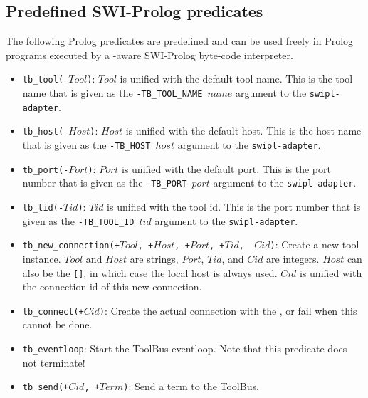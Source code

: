 \subsection{\label{Prolog-predicates}Predefined SWI-Prolog predicates}
The following Prolog predicates are predefined and can be used freely in
Prolog programs executed by a \TB -aware SWI-Prolog byte-code interpreter.

\begin{itemize}

\item {\tt tb\_tool(-$Tool$)}: $Tool$ is unified with the default tool name.
      This is the tool name that is given as the {\tt -TB\_TOOL\_NAME $name$}
      argument to the {\tt swipl-adapter}.

\item {\tt tb\_host(-$Host$)}: $Host$ is unified with the default host.
      This is the host name that is given as the {\tt -TB\_HOST $host$}
      argument to the {\tt swipl-adapter}.

\item {\tt tb\_port(-$Port$)}: $Port$ is unified with the default port.
      This is the port number that is given as the {\tt -TB\_PORT $port$}
      argument to the {\tt swipl-adapter}.

\item {\tt tb\_tid(-$Tid$)}: $Tid$ is unified with the tool id.
      This is the port number that is given as the {\tt -TB\_TOOL\_ID $tid$}
      argument to the {\tt swipl-adapter}.

\item {\tt tb\_new\_connection(+$Tool$, +$Host$, +$Port$, +$Tid$, -$Cid$)}: 
      Create a new tool instance. $Tool$ and $Host$ are
      strings, $Port$, $Tid$, and $Cid$ are integers. 
      $Host$ can also be the {\tt []}, in which
      case the local host is always used. $Cid$ is unified with the 
      connection id of this new connection.

\item {\tt tb\_connect(+$Cid$)}: Create the actual connection with the \TB,
      or fail when this cannot be done.

\item {\tt tb\_eventloop}: Start the ToolBus eventloop. Note that
      this predicate does not terminate!

\item {\tt tb\_send(+$Cid$, +$Term$)}: Send a term to the ToolBus.

\end{itemize}

